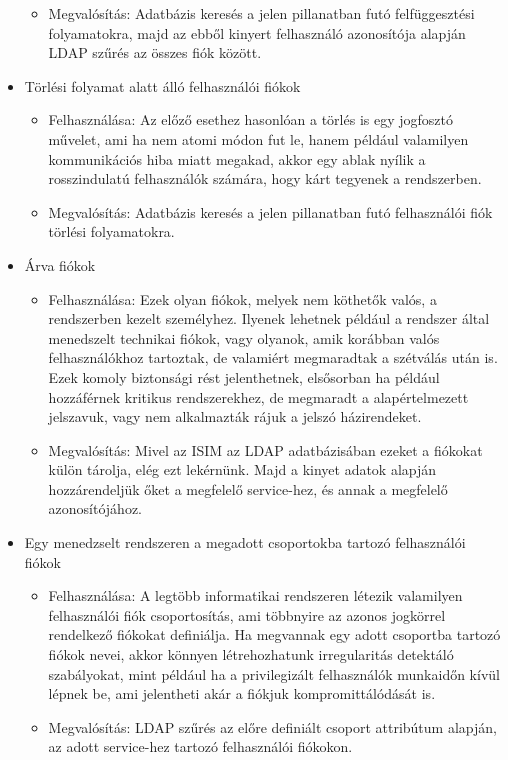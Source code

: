 \begin{itemize}
\begin{itemize}
		\item Megvalósítás: Adatbázis keresés a jelen pillanatban futó felfüggesztési folyamatokra, majd az ebből kinyert felhasználó azonosítója alapján LDAP szűrés az összes fiók között.
	\end{itemize}
	\item Törlési folyamat alatt álló felhasználói fiókok
	\begin{itemize}
		\small
		\item Felhasználása: Az előző esethez hasonlóan a törlés is egy jogfosztó művelet, ami ha nem atomi módon fut le, hanem például valamilyen kommunikációs hiba miatt megakad, akkor egy ablak nyílik a rosszindulatú felhasználók számára, hogy kárt tegyenek a rendszerben.
		\item Megvalósítás:  Adatbázis keresés a jelen pillanatban futó felhasználói fiók törlési folyamatokra.
	\end{itemize}
	\item Árva fiókok
	\begin{itemize}
		\small
		\item Felhasználása: Ezek olyan fiókok, melyek nem köthetők valós, a rendszerben kezelt személyhez. Ilyenek lehetnek például a rendszer által menedszelt technikai fiókok, vagy olyanok, amik korábban valós felhasználókhoz tartoztak, de valamiért megmaradtak a szétválás után is. Ezek komoly biztonsági rést jelenthetnek, elsősorban ha például hozzáférnek kritikus rendszerekhez, de megmaradt a alapértelmezett jelszavuk, vagy nem alkalmazták rájuk a jelszó házirendeket.
		\item Megvalósítás: Mivel az ISIM az LDAP adatbázisában ezeket a fiókokat külön tárolja, elég ezt lekérnünk. Majd a kinyet adatok alapján hozzárendeljük őket a megfelelő service-hez, és annak a megfelelő azonosítójához.
	\end{itemize}
	\item Egy menedzselt rendszeren a megadott csoportokba tartozó felhasználói fiókok
	\begin{itemize}
		\small
		\item Felhasználása: A legtöbb informatikai rendszeren létezik valamilyen felhasználói fiók csoportosítás, ami többnyire az azonos jogkörrel rendelkező fiókokat definiálja. Ha megvannak egy adott csoportba tartozó fiókok nevei, akkor könnyen létrehozhatunk irregularitás detektáló szabályokat, mint például ha a privilegizált felhasználók munkaidőn kívül lépnek be, ami jelentheti akár a fiókjuk kompromittálódását is.
		\item Megvalósítás: LDAP szűrés az előre definiált csoport attribútum alapján, az adott service-hez tartozó felhasználói fiókokon.
	\end{itemize}
	
\end{itemize}
